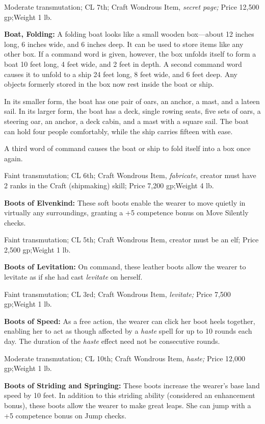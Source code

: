 \documentclass{article}
\begin{document}
Moderate transmutation; CL 7th; Craft Wondrous Item, \textit{secret page; }Price 
12,500 gp;Weight 1 lb.

\textbf{Boat, Folding:} A folding boat looks like a small wooden box---about 12 
inches long, 6 inches wide, and 6 inches deep. It can be used to store items like 
any other box. If a command word is given, however, the box unfolds itself to form 
a boat 10 feet long, 4 feet wide, and 2 feet in depth. A second command word causes 
it to unfold to a ship 24 feet long, 8 feet wide, and 6 feet deep. Any objects 
formerly stored in the box now rest inside the boat or ship.

In its smaller form, the boat has one pair of oars, an anchor, a mast, and a lateen 
sail. In its larger form, the boat has a deck, single rowing seats, five sets of 
oars, a steering oar, an anchor, a deck cabin, and a mast with a square sail. The 
boat can hold four people comfortably, while the ship carries fifteen with ease.

A third word of command causes the boat or ship to fold itself into a box once 
again.

Faint transmutation; CL 6th; Craft Wondrous Item, \textit{fabricate}, creator must 
have 2 ranks in the Craft (shipmaking) skill; Price 7,200 gp;Weight 4 lb.

\textbf{Boots of Elvenkind:} These soft boots enable the wearer to move quietly 
in virtually any surroundings, granting a +5 competence bonus on Move Silently 
checks.

Faint transmutation; CL 5th; Craft Wondrous Item, creator must be an elf; Price 
2,500 gp;Weight 1 lb.

\textbf{Boots of Levitation:} On command, these leather boots allow the wearer 
to levitate as if she had cast \textit{levitate }on herself.

Faint transmutation; CL 3rd; Craft Wondrous Item, \textit{levitate; }Price 7,500 
gp;Weight 1 lb.

\textbf{Boots of Speed:} As a free action, the wearer can click her boot heels 
together, enabling her to act as though affected by a \textit{haste }spell for 
up to 10 rounds each day. The duration of the \textit{haste }effect need not be 
consecutive rounds.

Moderate transmutation; CL 10th; Craft Wondrous Item, \textit{haste; }Price 12,000 
gp;Weight 1 lb.

\textbf{Boots of Striding and Springing:} These boots increase the wearer's base 
land speed by 10 feet. In addition to this striding ability (considered an enhancement 
bonus), these boots allow the wearer to make great leaps. She can jump with a +5 
competence bonus on Jump checks.
\end{document}
